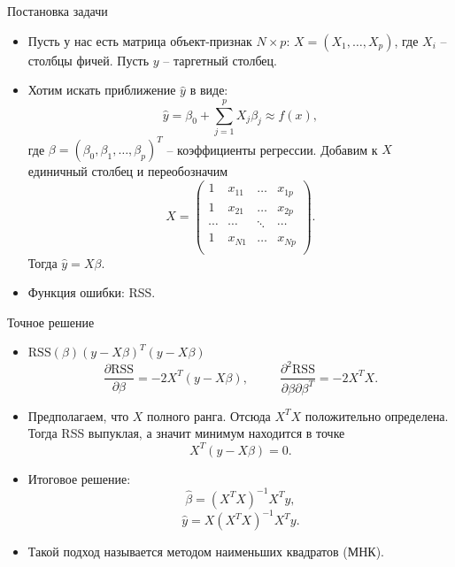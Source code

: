 \documentclass[9pt]{beamer}
\begin{document}
\begin{frame}{Постановка задачи}
\begin{itemize}
    \item Пусть у нас есть матрица объект-признак $N\times p$: $X = (X_1,\ldots,X_p)$, где $X_i$ – столбцы фичей. Пусть $y$ – таргетный столбец.
    \item Хотим искать приближение $\hat y$ в виде:
    $$\hat y =\beta_0 + \sum_{j=1}^p X_j\beta_j \approx f(x),$$
    где $\beta = (\beta_0,\beta_1,\ldots,\beta_p)^T$ – коэффициенты регрессии.
    Добавим к $X$ единичный столбец и переобозначим
    $$X = \begin{pmatrix} 1&x_{11}&\ldots&x_{1p}\\1&x_{21}&\ldots&x_{2p}\\\cdots&\cdots&\ddots&\cdots\\1&x_{N1}&\ldots&x_{Np}\\ \end{pmatrix}.$$
    Тогда $\hat y = X\beta$.
    \item Функция ошибки: RSS.
\end{itemize}
\end{frame}

\begin{frame}{Точное решение}
    \begin{itemize}
        \item $\text{RSS}(\beta) (y-X\beta)^T(y- X\beta)$
        $$\frac{\partial \text{RSS}}{\partial \beta} = -2X^T(y-X\beta),\;\;\;\;\;\;\;\;\;\frac{\partial^2 \text{RSS}}{\partial \beta\partial\beta^T} = -2X^TX.$$
        \item Предполагаем, что $X$ полного ранга. Отсюда $X^TX$ положительно определена. Тогда RSS выпуклая, а значит минимум находится в точке
        \begin{equation}\label{linreg_projection}
            X^T(y-X\beta) = 0.
        \end{equation}
        \item Итоговое решение:
        \begin{equation}\label{linreg_hat_beta}
            \hat \beta = (X^TX)^{-1}X^Ty,    
        \end{equation}
        \begin{equation}
            \hat y = X(X^TX)^{-1}X^Ty.
        \end{equation}        
        \item Такой подход называется методом наименьших квадратов (МНК).
    \end{itemize}
\end{frame}
\end{document}
